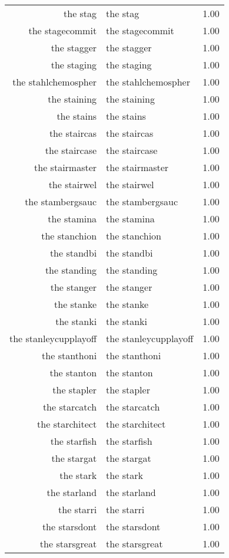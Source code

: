 \begin{table}[ht]
\begin{tabular}{rlr}
  the stag & the stag & 1.00 \\ 
  the stagecommit & the stagecommit & 1.00 \\ 
  the stagger & the stagger & 1.00 \\ 
  the staging & the staging & 1.00 \\ 
  the stahlchemospher & the stahlchemospher & 1.00 \\ 
  the staining & the staining & 1.00 \\ 
  the stains & the stains & 1.00 \\ 
  the staircas & the staircas & 1.00 \\ 
  the staircase & the staircase & 1.00 \\ 
  the stairmaster & the stairmaster & 1.00 \\ 
  the stairwel & the stairwel & 1.00 \\ 
  the stambergsauc & the stambergsauc & 1.00 \\ 
  the stamina & the stamina & 1.00 \\ 
  the stanchion & the stanchion & 1.00 \\ 
  the standbi & the standbi & 1.00 \\ 
  the standing & the standing & 1.00 \\ 
  the stanger & the stanger & 1.00 \\ 
  the stanke & the stanke & 1.00 \\ 
  the stanki & the stanki & 1.00 \\ 
  the stanleycupplayoff & the stanleycupplayoff & 1.00 \\ 
  the stanthoni & the stanthoni & 1.00 \\ 
  the stanton & the stanton & 1.00 \\ 
  the stapler & the stapler & 1.00 \\ 
  the starcatch & the starcatch & 1.00 \\ 
  the starchitect & the starchitect & 1.00 \\ 
  the starfish & the starfish & 1.00 \\ 
  the stargat & the stargat & 1.00 \\ 
  the stark & the stark & 1.00 \\ 
  the starland & the starland & 1.00 \\ 
  the starri & the starri & 1.00 \\ 
  the starsdont & the starsdont & 1.00 \\ 
  the starsgreat & the starsgreat & 1.00 \\ 

\end{tabular}
\end{table}

